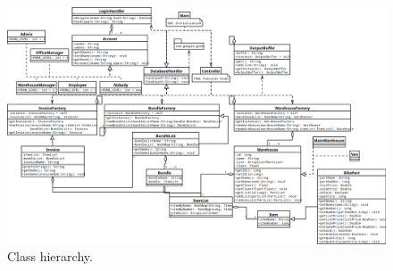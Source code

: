 \documentclass{report}
\begin{document}
\begin{figure}
  \centering
    \includegraphics[width=\textwidth,height=\textheight,keepaspectratio]{../diagrams/image_versions/overview.png}
    \caption{Class hierarchy.}
\end{figure}



\end{document}
